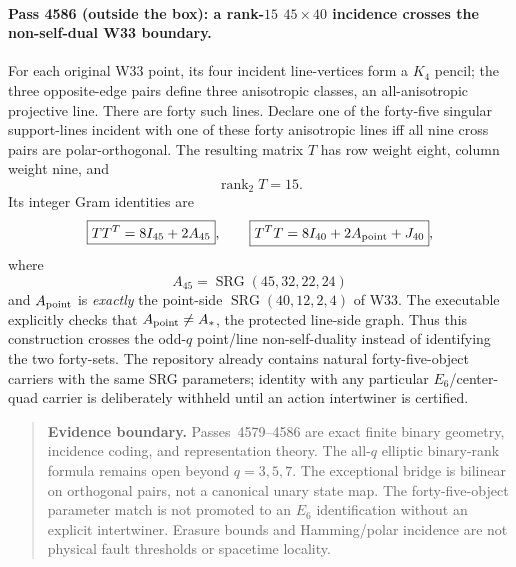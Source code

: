 \paragraph{Pass 4586 (outside the box): a rank-$15$ $45\times40$ incidence crosses the non-self-dual W33 boundary.}
For each original W33 point, its four incident line-vertices form a $K_4$ pencil;
the three opposite-edge pairs define three anisotropic classes, an
all-anisotropic projective line.  There are forty such lines.  Declare one of
the forty-five singular support-lines incident with one of these forty
anisotropic lines iff all nine cross pairs are polar-orthogonal.  The resulting
matrix $T$ has row weight eight, column weight nine, and
\[
 \boxed{\operatorname{rank}_2T=15}.
\]
Its integer Gram identities are
\[
 \boxed{TT^T=8I_{45}+2A_{45}},\qquad
 \boxed{T^TT=8I_{40}+2A_{\rm point}+J_{40}},
\]
where
\[
 A_{45}=\operatorname{SRG}(45,32,22,24)
\]
and $A_{\rm point}$ is \emph{exactly} the point-side
$\operatorname{SRG}(40,12,2,4)$ of W33.  The executable explicitly checks that
$A_{\rm point}\ne A_*$, the protected line-side graph.  Thus this construction
crosses the odd-$q$ point/line non-self-duality instead of identifying the two
forty-sets.  The repository already contains natural forty-five-object carriers
with the same SRG parameters; identity with any particular $E_6$/center-quad
carrier is deliberately withheld until an action intertwiner is certified.

\begin{quote}\small
\textbf{Evidence boundary.} Passes~4579--4586 are exact finite binary geometry,
incidence coding, and representation theory.  The all-$q$ elliptic binary-rank
formula remains open beyond $q=3,5,7$.  The exceptional bridge is bilinear on
orthogonal pairs, not a canonical unary state map.  The forty-five-object
parameter match is not promoted to an $E_6$ identification without an explicit
intertwiner.  Erasure bounds and Hamming/polar incidence are not physical fault
thresholds or spacetime locality.
\end{quote}
